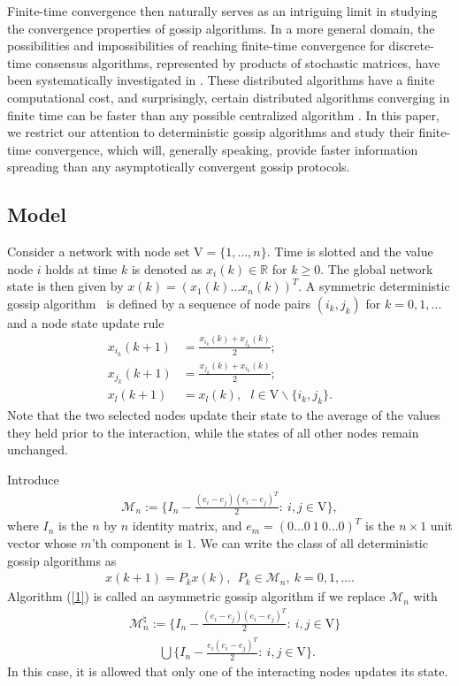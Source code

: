 \documentclass[a4paper, 11pt]{article}
\begin{document}
{
Finite-time convergence then naturally serves as an intriguing  limit in studying the convergence properties of gossip algorithms.
In a more general domain, the possibilities and impossibilities of reaching finite-time convergence for discrete-time consensus algorithms, represented by products of stochastic matrices,  have been  systematically investigated in \cite{Finite1,Finite2,julien-automatica,julien-tac}.  These distributed algorithms have a finite computational cost, and surprisingly,  certain distributed algorithms converging in
finite time  can be  faster than any possible centralized
algorithm \cite{julien-automatica}. In this paper, we restrict our attention to deterministic gossip algorithms and study their finite-time convergence, which will,  generally speaking, provide faster information spreading than any asymptotically convergent gossip protocols.
}



\subsection{Model}  Consider a network with node set $\mathrm{V}=\{1,\dots,n\}$. Time is slotted and the value  node $i$ holds at time $k$ is denoted as $x_i(k)\in\mathbb{R}$ for $k\geq0$. The global network state is then given by $x(k)=(x_1(k) \dots x_n(k))^T$.  A symmetric deterministic gossip  algorithm~\cite{Kempe2003,Boyd2006} is defined by a sequence of node pairs $(i_{k}, j_{k})$ for $k=0, 1, \dots$ and a node state update rule
\begin{align*}
	x_{i_k}(k+1) &= \frac{x_{i_k}(k)+x_{j_k}(k)}{2};&&\\[2mm]
	x_{j_k}(k+1) &= \frac{x_{j_k}(k)+x_{i_k}(k)}{2};&&\\[2mm]
	x_{l}( k+1) &= x_{l}(k), \ \ \ l \in \mathrm{V}\backslash \{i_k, j_k\}.
\end{align*}
Note that the two selected nodes update their state to the average of the values they held prior to the interaction, while the states of all other nodes remain unchanged.

Introduce
\begin{align}\label{102}
 \mathscr{M}_n:=\Big\{ I_n-\frac{(e_i-e_j)(e_i-e_j)^T}{2}:\  i,j\in \mathrm{V} \Big\},
\end{align}
where $I_n$ is the $n$ by $n$ identity matrix, and  $e_m=(0 \dots 0\  1\  0 \dots 0)^T$ is the $n\times1$ unit vector whose $m$'th component is $1$.   We can write the class of all deterministic gossip algorithms as
\begin{align}\label{1}
 x(k+1)=P_kx(k),\ \ P_k \in \mathscr{M}_n,\  k=0,1,\dots.
 \end{align}
 Algorithm (\ref{1}) is called an asymmetric gossip algorithm if  we replace $ \mathscr{M}_n$ with \cite{Fagnani2008}
\begin{align}
 &\mathscr{M}_n^\natural:=\Big\{  I_n-\frac{(e_i-e_j)(e_i-e_j)^T}{2}:\  i,j\in \mathrm{V}\Big\}\nonumber\\
 &\ \ \ \ \ \ \ \ \ \ \ \bigcup \Big\{  I_n-\frac{e_i(e_i-e_j)^T}{2}:\  i,j\in\mathrm{V}\Big\}. \nonumber
\end{align}
In this case, it is allowed  that only one of the interacting nodes updates its state.
\end{document}
